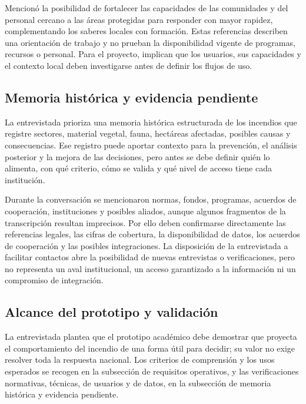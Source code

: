 Mencionó la posibilidad de fortalecer las capacidades de las comunidades y del personal cercano a las áreas protegidas para responder con mayor rapidez, complementando los saberes locales con formación. Estas referencias describen una orientación de trabajo y no prueban la disponibilidad vigente de programas, recursos o personal. Para el proyecto, implican que los usuarios, sus capacidades y el contexto local deben investigarse antes de definir los flujos de uso.

\subsection{Memoria histórica y evidencia pendiente}

La entrevistada prioriza una memoria histórica estructurada de los incendios que registre sectores, material vegetal, fauna, hectáreas afectadas, posibles causas y consecuencias. Ese registro puede aportar contexto para la prevención, el análisis posterior y la mejora de las decisiones, pero antes se debe definir quién lo alimenta, con qué criterio, cómo se valida y qué nivel de acceso tiene cada institución.

Durante la conversación se mencionaron normas, fondos, programas, acuerdos de cooperación, instituciones y posibles aliados, aunque algunos fragmentos de la transcripción resultan imprecisos. Por ello deben confirmarse directamente las referencias legales, las cifras de cobertura, la disponibilidad de datos, los acuerdos de cooperación y las posibles integraciones. La disposición de la entrevistada a facilitar contactos abre la posibilidad de nuevas entrevistas o verificaciones, pero no representa un aval institucional, un acceso garantizado a la información ni un compromiso de integración.

\subsection{Alcance del prototipo y validación}

La entrevistada plantea que el prototipo académico debe demostrar que proyecta el comportamiento del incendio de una forma útil para decidir; su valor no exige resolver toda la respuesta nacional. Los criterios de comprensión y los usos esperados se recogen en la subsección de requisitos operativos, y las verificaciones normativas, técnicas, de usuarios y de datos, en la subsección de memoria histórica y evidencia pendiente.

